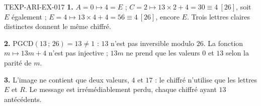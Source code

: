 \begin{corrige}{TEXP-ARI-EX-017}
\textbf{1.} $A=0\mapsto4=E$ ; $C=2\mapsto13\times2+4=30\equiv4\ [26]$, soit
$E$ également ; $E=4\mapsto13\times4+4=56\equiv4\ [26]$, encore $E$. Trois
lettres claires distinctes donnent le même chiffré.

\textbf{2.} $\mathrm{PGCD}(13\,;\,26)=13\neq1$ : $13$ n'est pas inversible
modulo $26$. La fonction $m\mapsto13m+4$ n'est pas injective ; $13m$ ne prend
que les valeurs $0$ et $13$ selon la parité de $m$.

\textbf{3.} L'image ne contient que deux valeurs, $4$ et $17$ : le chiffré
n'utilise que les lettres $E$ et $R$. Le message est irrémédiablement perdu,
chaque chiffré ayant $13$ antécédents.
\end{corrige}
